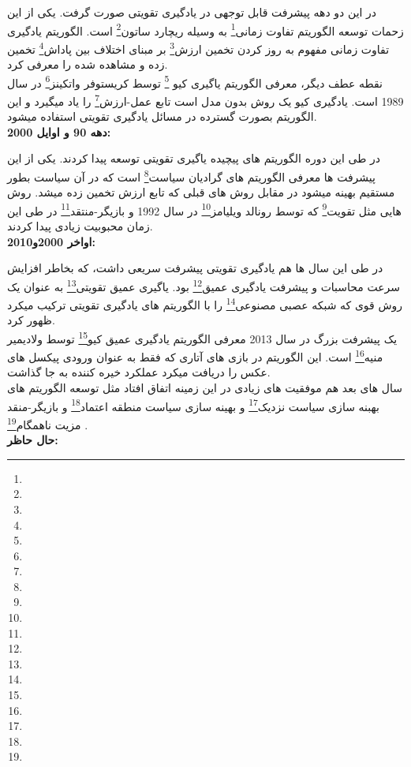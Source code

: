 \documentclass[12pt,a4paper]{report}
\begin{document}
	در این دو دهه پیشرفت قابل توجهی در یادگیری تقویتی صورت گرفت. یکی از این زحمات توسعه الگوریتم تفاوت زمانی\footnote{} به وسیله ریچارد ساتون\footnote{} است. الگوریتم یادگیری تفاوت زمانی مفهوم \cite{sutton1988learning}به روز کردن تخمین ارزش\footnote{} بر مبنای اختلاف بین پاداش\footnote{} تخمین زده و مشاهده شده را معرفی کرد.\\
	نقطه عطف دیگر، معرفی الگوریتم یاگیری کیو \footnote{} توسط کریستوفر واتکینز\footnote{} \cite{watkins1992q}در سال 1989 است. یادگیری کیو یک روش بدون مدل است تابع عمل-ارزش\footnote{} را یاد میگیرد و این الگوریتم بصورت گسترده در مسائل یادگیری تقویتی استفاده میشود.\\
	\textbf{دهه 90 و اوایل 2000:}
	
	
	در طی این دوره الگوریتم های پیچیده یاگیری تقویتی توسعه پیدا کردند. یکی از این پیشرفت ها معرفی الگوریتم های گرادیان سیاست\footnote{} است که در آن سیاست بطور مستقیم بهینه میشود در مقابل روش های قبلی که تابع ارزش تخمین زده میشد. روش هایی مثل تقویت\footnote{} که توسط رونالد ویلیامز\footnote{} در سال 1992 و بازیگر-منتقد\footnote{} در طی این زمان محبوبیت زیادی پیدا کردند.\\
	\textbf{اواخر 2000و2010:}
	
	در طی این سال ها هم یادگیری تقویتی پیشرفت سریعی داشت، که بخاطر افزایش سرعت محاسبات  و پیشرفت یادگیری عمیق\footnote{} بود. یاگیری عمیق تقویتی\footnote{} به عنوان یک روش قوی که شبکه عصبی مصنوعی\footnote{} را با الگوریتم های یادگیری تقویتی ترکیب میکرد ظهور کرد.\\
	یک پیشرفت بزرگ در سال 2013 معرفی الگوریتم یادگیری عمیق کیو\footnote{} \cite{mnih2015human} توسط ولادیمیر منیه\footnote{} است. این الگوریتم در بازی های آتاری که فقط به عنوان ورودی پیکسل های عکس را دریافت میکرد عملکرد خیره کننده به جا گذاشت.\\
	سال های بعد هم موفقیت های زیادی در این زمینه اتفاق افتاد مثل توسعه الگوریتم های بهبنه سازی سیاست نزدیک\footnote{} \cite{schulman2017proximal}و بهینه سازی سیاست منطقه اعتماد\footnote{} \cite{schulman2015trust}و بازیگر-منقد مزیت ناهمگام\footnote{} \cite{mnih2016asynchronous}.\\	
	\textbf{حال حاظر:}
\end{document}
